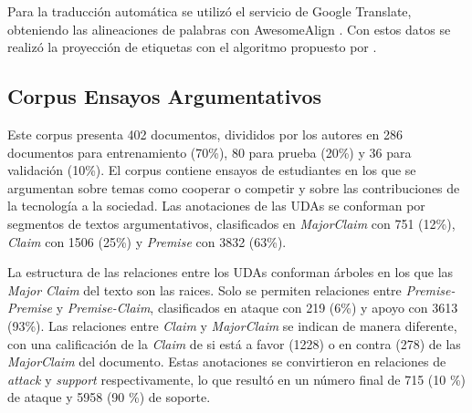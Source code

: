 \documentclass[a4paper,11pt,twocolumn,twoside]{article}
\begin{document}
Para la traducción automática se utilizó el servicio de Google Translate,
obteniendo las alineaciones de palabras con AwesomeAlign \cite{dou2021word}.
Con estos datos se realizó la proyección de etiquetas con el algoritmo propuesto 
por .


\subsection{Corpus Ensayos Argumentativos}\label{corpus:persuasive_essays}

Este corpus \cite{stab2017parsing} presenta 402 documentos, divididos por los autores en 286 documentos para entrenamiento (70\%), 
80 para prueba (20\%) y 36 para validación (10\%). El corpus contiene ensayos de estudiantes en los que 
se argumentan sobre temas como cooperar o competir y sobre las contribuciones de la tecnología a la sociedad.
Las anotaciones de las UDAs se conforman por segmentos de textos argumentativos,
clasificados en \textit{MajorClaim} con 751 (12\%), \textit{Claim} con 1506 (25\%) y \textit{Premise} con 3832 (63\%).

La estructura de las relaciones entre los UDAs conforman árboles en los que las \textit{Major Claim} 
del texto son las raices. Solo se permiten relaciones entre \textit{Premise-Premise} y \textit{Premise-Claim}, 
clasificados en ataque con 219 (6\%) y apoyo con 3613 (93\%). Las relaciones entre \textit{Claim} y \textit{MajorClaim} 
se indican de manera diferente, con una calificación de la \textit{Claim} de si está a favor (1228) o en contra (278) de las \textit{MajorClaim} 
del documento. Estas anotaciones se convirtieron en relaciones de \textit{attack} y \textit{support} respectivamente, 
lo que resultó en un número final de 715 (10 \%) de ataque y 5958 (90 \%) de soporte.

\end{document}
